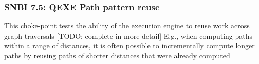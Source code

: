 \subsubsection{SNBI 7.5: QEXE Path pattern reuse}
\label{choke_point_7.5}
This choke-point tests the ability of the execution engine to reuse work across graph traversals [TODO: complete in more detail]
E.g., when computing paths within a range of distances, it is often possible to incrementally compute longer paths by reusing paths of shorter distances that were already computed
